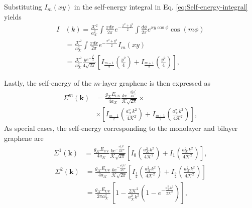 \documentclass[english,aps,prd,nofootinbib,twocolumn]{revtex4-1}
\begin{document}
Substituting $I_{m}(xy)$ in the self-energy integral in Eq. \eqref{eq:Self-energy-integral} yields
\begin{equation}
\begin{split}
I&(k) =
\frac{\mathcal{K}^{2}}{a_{\mathcal{K}}^{2}}\!\!
\int \!\! \frac{x dx}{2\pi}
e^{-\tfrac{x^{2}+y^{2}}{2} } \!\!
\int \!\! \frac{d\phi }{2\pi}
e^{xy \cos \!\phi} 
\! \cos(m\phi) 
\\ &=
\frac{\mathcal{K}^{2}}{a_{\mathcal{K}}^{2}}\!\!
\int \!\! \frac{x dx}{2\pi}
e^{-\tfrac{x^{2}+y^{2}}{2} } \! I_{m}(xy)
\\ &=
\frac{\mathcal{K}^{2}}{a_{\mathcal{K}}^{2}}
\frac{y e^{-\frac{y^{2}}{4}}}{4\sqrt{2\pi}}
\left[ 
I_{\frac{m-1}{2}}\left(\frac{y^{2}}{4}\right) + 
I_{\frac{m+1}{2}}\left(\frac{y^{2}}{4}\right)
\right]
,
\end{split}
\end{equation}

Lastly, the self-energy of the $m$-layer graphene is then expressed as
\begin{equation}
\begin{split}
\Sigma^{m}(\mathbf{k })
\! &= \!
\frac{g_{\mathcal{K}}E_{\mathrm{UV}}}{4a_{\mathcal{K}}}
\frac{k e^{-\frac{a_{\mathcal{K}}^{2}k^{2}}{4\mathcal{K}^{2}}}}{\mathcal{K}\sqrt{2\pi}}
 \times \\ &\times
\left[ 
I_{\frac{m-1}{2}}\!\!
\left(\frac{a_{\mathcal{K}}^{2}k^{2}}{4\mathcal{K}^{2}}\right)
\!\! + \!
I_{\frac{m+1}{2}}\!\!
\left(\frac{a_{\mathcal{K}}^{2}k^{2}}{4\mathcal{K}^{2}}\right)
\!
\right]
\!
,
\end{split}
\end{equation}
As special cases, the self-energy corresponding to the monolayer and bilayer graphene are
\begin{equation}
\begin{split}
\Sigma^{1}\!(\mathbf{k })
\! &= \!
\frac{g_{\mathcal{K}}E_{\mathrm{UV}}}{4a_{\mathcal{K}}}
\frac{k e^{-\frac{a_{\mathcal{K}}^{2}k^{2}}{4\mathcal{K}^{2}}}}{\mathcal{K}\sqrt{2\pi}}
\!\!
\left[ 
I_{0}\!\!
\left(\frac{a_{\mathcal{K}}^{2}k^{2}}{4\mathcal{K}^{2}}\right)
\!\! + \!
I_{1}\!\!
\left(\frac{a_{\mathcal{K}}^{2}k^{2}}{4\mathcal{K}^{2}}\right)
\!
\right]
\!
,
\end{split}
\end{equation}
\begin{equation}
\begin{split}
\Sigma^{2}(\mathbf{k })
\! &= \!
\frac{g_{\mathcal{K}}E_{\mathrm{UV}}}{4a_{\mathcal{K}}}
\frac{k e^{-\frac{a_{\mathcal{K}}^{2}k^{2}}{4\mathcal{K}^{2}}}}{\mathcal{K}\sqrt{2\pi}}
\!\!
\left[ 
I_{\frac{1}{2}}\!\!
\left(\frac{a_{\mathcal{K}}^{2}k^{2}}{4\mathcal{K}^{2}}\right)
\!\! + \!
I_{\frac{3}{2}}\!\!
\left(\frac{a_{\mathcal{K}}^{2}k^{2}}{4\mathcal{K}^{2}}\right)
\!
\right]
\! \\ &= \!
\frac{g_{\mathcal{K}}E_{\mathrm{UV}}}{2\pi a_{\mathcal{K}}^{2}}
\left[
1 - 
\frac{2\mathcal{K}^{2}}{a_{\mathcal{K}}^{2}k^{2}}
\left(
1-e^{-\frac{a_{\mathcal{K}}^{2}k^{2}}{2\mathcal{K}^{2}}}
\right)
\right]
\!
,
\end{split}
\end{equation}
\end{document}
